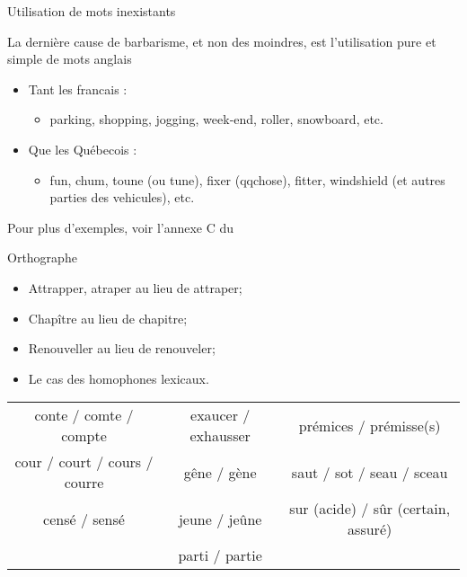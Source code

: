 \documentclass[french]{beamer}
\newcommand\red[1]{{\color{ulred}{\textbf{#1}}}}
\begin{document}
\begin{frame}{Utilisation de mots inexistants}

La dernière cause de barbarisme, et non des moindres, est l'utilisation pure et simple de mots anglais
\begin{itemize}
	\item Tant les francais : 
	\begin{itemize}
		\item parking, shopping, jogging, week-end, roller, snowboard, etc.
	\end{itemize}
	\item Que les Québecois : 
	\begin{itemize}
		\item fun, chum, toune (ou tune), fixer (qqchose), fitter, windshield (et autres parties des vehicules), etc. 
	\end{itemize}
\end{itemize}
Pour plus d'exemples, voir l'annexe C du \href{http://www2.ift.ulaval.ca/\%7Echaib/IFT-6001/articles/ManuelRuddyLelouche.pdf}{\red{document de Lelouche}}
\end{frame}


\begin{frame}{Orthographe}

\begin{itemize}
	\item Attrapper, atraper au lieu de attraper;
	\item Chapître au lieu de chapitre;
	\item Renouveller au lieu de renouveler;
	\item Le cas des homophones lexicaux.
\end{itemize}	

\begin{center}\scriptsize
	\begin{tabular}{ccc}
		conte / comte / compte & exaucer / exhausser & prémices / prémisse(s) \\ 
		cour / court / cours / courre & gêne / gène &  saut / sot / seau / sceau\\ 
		censé / sensé & jeune / jeûne &  sur (acide) / sûr (certain, assuré)\\ 
		~ & parti / partie & ~ \\ 
	\end{tabular} 
\end{center}
\end{frame}
\end{document}
